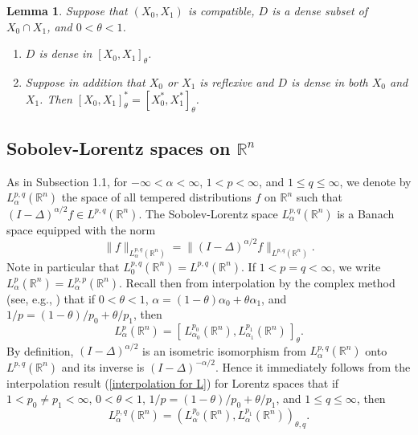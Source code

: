 \documentclass[reqno,centertags,11pt]{amsart}
\newtheorem{lem}[thm]{Lemma}
\theoremstyle{definition}
\numberwithin{thm}{section}
\numberwithin{equation}{section}
\newcommand{\R}{{\mathbb{R}}}
\begin{document}
\begin{lem}\label{density and duality in complex interp} Suppose that $(X_0 , X_1 )$ is compatible, $D$ is a dense subset of $X_0\cap X_1$,  and    $0< \theta < 1$.
\begin{enumerate}[{\upshape (i)}]
\item   $D$ is dense in $\left[ X_0 , X_1 \right]_{\theta}$.
\item  Suppose in addition that $X_0$ or $X_1$ is reflexive and $D$ is dense in both $X_0$ and $X_1$. Then $      \left[ X_0 , X_1 \right]_{\theta}^*=\left[ X_0^* , X_1^* \right]_{\theta}$.
\end{enumerate}
\end{lem}


\subsection{Sobolev-Lorentz spaces on $\R^n$}

As in Subsection 1.1, for $-\infty<\alpha<\infty$,   $1< p<\infty$, and $1 \le q \le \infty$, we denote by $L_\alpha^{p,q}(\R^n )$ the space of all  tempered  distributions  $f$ on $\R^n $ such that $(I-\Delta )^{\alpha/2} f   \in L^{p,q} (\R^n )$. The Sobolev-Lorentz space $L_\alpha^{p,q}(\R^n )$ is a Banach space equipped with the   norm
\[
\|f\|_{L_\alpha^{p,q}(\R^n )} = \|(I-\Delta )^{\alpha/2} f \|_{L^{p,q} (\R^n )}.
\]%
Note in particular that $L_0^{p,q}(\R^n )= L^{p,q}(\R^n )$.
If $1<p=q<\infty$, we write $L_\alpha^{p}(\R^n )= L_\alpha^{p,p}(\R^n )$.
Recall then from   interpolation by the complex method  (see, e.g., \cite[Theorem 6.4.5]{bergh}) that if $0<\theta < 1$, $\alpha =(1-\theta )\alpha_0 +\theta \alpha_1$, and  $1/p=(1-\theta)/p_0 +\theta/p_1$, then
\[
 L_\alpha^{p}(\R^n ) = \left[\,  L_{\alpha_0}^{p_0}(\R^n ) , L_{\alpha_1}^{p_1}(\R^n ) \, \right]_{\theta}.
\]
By definition, $(I-\Delta )^{\alpha/2}$ is an isometric isomorphism from
$L_\alpha^{p,q}(\R^n )$ onto $ L^{p,q}(\R^n )$ and its inverse is $(I-\Delta )^{-\alpha/2}$. Hence it immediately follows  from the   interpolation result (\ref{interpolation for L}) for Lorentz spaces  that if $ 1<  p_0 \neq p_1 < \infty $, $0<\theta<1$,    $1/p =(1-\theta)/p_0 + \theta /p_1$, and $1 \le q \le \infty$, then
\begin{equation}\label{interpolation for SL on Rn}
L_\alpha^{p,q}(\R^n )= \left( L_\alpha^{p_0 }(\R^n ), L_\alpha^{p_1}(\R^n ) \right)_{\theta,q}   .
\end{equation}
\end{document}
